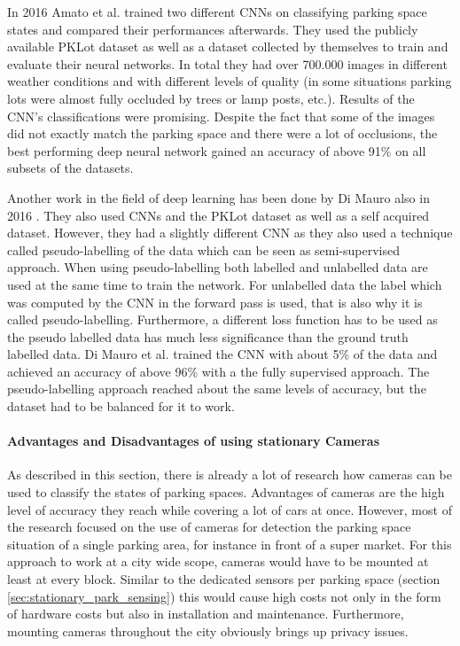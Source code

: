In 2016 Amato et al. \cite{Amato2016} trained two different CNNs on classifying parking space states and compared their performances afterwards. They used the publicly available PKLot dataset as well as a dataset collected by themselves to train and evaluate their neural networks. In total they had over 700.000 images in different weather conditions and with different levels of quality (in some situations parking lots were almost fully occluded by trees or lamp posts, etc.). Results of the CNN's classifications were promising. Despite the fact that some of the images did not exactly match the parking space and there were a lot of occlusions, the best performing deep neural network gained an accuracy of above 91\% on all subsets of the datasets. 

Another work in the field of deep learning has been done by Di Mauro also in 2016 \cite{DiMauro2016}. They also used CNNs and the PKLot dataset as well as a self acquired dataset. However, they had a slightly different CNN as they also used a technique called pseudo-labelling of the data which can be seen as semi-supervised approach. When using pseudo-labelling both labelled and unlabelled data are used at the same time to train the network. For unlabelled data the label which was computed by the CNN in the forward pass is used, that is also why it is called pseudo-labelling. Furthermore, a different loss function has to be used as the pseudo labelled data has much less significance than the ground truth labelled data. Di Mauro et al. trained the CNN with about 5\% of the data and achieved an accuracy of above 96\% with a the fully supervised approach. The pseudo-labelling approach reached about the same levels of accuracy, but the dataset had to be balanced for it to work.


\paragraph{Advantages and Disadvantages of using stationary Cameras}

As described in this section, there is already a lot of research how cameras can be used to classify the states of parking spaces. Advantages of cameras are the high level of accuracy they reach while covering a lot of cars at once. However, most of the research focused on the use of cameras for detection the parking space situation of a single parking area, for instance in front of a super market. For this approach to work at a city wide scope, cameras would have to be mounted at least at every block. Similar to the dedicated sensors per parking space (section \ref{sec:stationary_park_sensing}) this would cause high costs not only in the form of hardware costs but also in installation and maintenance. Furthermore, mounting cameras throughout the city obviously brings up privacy issues.





